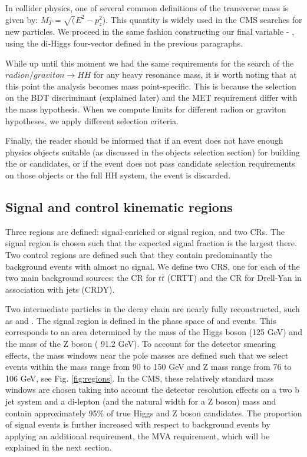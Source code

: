 In collider physics, one of several common definitions of the transverse mass is given by:
$M_T=\sqrt( E^2- p_z^2)$. This quantity is widely used in the CMS searches for new particles. We proceed in the same fashion constructing our final variable - \mTHH, using the di-Higgs four-vector defined in the previous paragraphs. 

While up until this moment we had the same requirements for the search of the $radion/graviton \to HH$ for any heavy resonance mass, it is worth noting that at this point the analysis becomes mass point-specific. This is because the selection on the BDT discriminant (explained later) and the MET requirement differ with the mass hypothesis. When we compute limits for different radion or graviton hypotheses, we apply different selection criteria. 

Finally, the reader should be informed that if an event does not have enough physics objects suitable (as discussed in the objects selection section) for building the \Zll or \HBB candidates, or if the event does not pass candidate selection requirements on those objects or the full HH system, the event is discarded.

  
  
  
  
  
  
\subsection{Signal and control kinematic regions}

Three regions are defined: signal-enriched or signal region, and two CRs. The signal region is chosen such that the expected signal fraction is the largest there. Two control regions are defined such that they contain predominantly the background events with almost no signal. We define two CRS, one for each of the two main background sources: the CR for $t\bar{t}$ (CRTT) and the CR for Drell-Yan in association with jets (CRDY).

Two intermediate particles in the decay chain are nearly fully reconstructed, such as \HBB and \Zll. The signal region is defined in the phase space of \HBB and \Zll events. This corresponds to an area determined by the mass of the Higgs boson (125 GeV) and the mass of the Z boson ( 91.2 GeV). To account for the detector smearing effects, the mass windows near the pole masses are defined such that we select events within the \HBB mass range from 90 to 150 GeV and Z mass range from 76 to 106 GeV, see Fig. \ref{fig:regions}. In the CMS, these relatively standard  mass windows are chosen taking into account the detector resolution effects on a two b jet system and a di-lepton (and the natural width for a Z boson) mass and contain approximately 95$\%$ of true Higgs and Z boson candidates. The proportion of signal events is further increased with respect to background events by applying an additional requirement, the MVA requirement, which will be explained in the next section.

